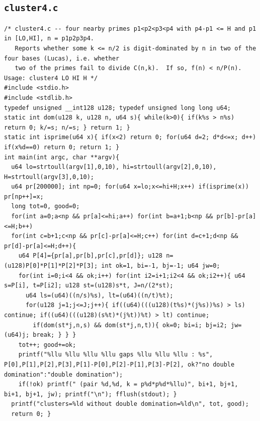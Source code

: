 \documentclass[11pt,a4paper]{article}
\theoremstyle{definition}
\begin{document}
\subsection{\texttt{cluster4.c}}
\begin{lstlisting}
/* cluster4.c -- four nearby primes p1<p2<p3<p4 with p4-p1 <= H and p1 in [LO,HI], n = p1p2p3p4.
   Reports whether some k <= n/2 is digit-dominated by n in two of the four bases (Lucas), i.e. whether
   two of the primes fail to divide C(n,k).  If so, f(n) < n/P(n).   Usage: cluster4 LO HI H */
#include <stdio.h>
#include <stdlib.h>
typedef unsigned __int128 u128; typedef unsigned long long u64;
static int dom(u128 k, u128 n, u64 s){ while(k>0){ if(k%s > n%s) return 0; k/=s; n/=s; } return 1; }
static int isprime(u64 x){ if(x<2) return 0; for(u64 d=2; d*d<=x; d++) if(x%d==0) return 0; return 1; }
int main(int argc, char **argv){
  u64 lo=strtoull(argv[1],0,10), hi=strtoull(argv[2],0,10), H=strtoull(argv[3],0,10);
  u64 pr[200000]; int np=0; for(u64 x=lo;x<=hi+H;x++) if(isprime(x)) pr[np++]=x;
  long tot=0, good=0;
  for(int a=0;a<np && pr[a]<=hi;a++) for(int b=a+1;b<np && pr[b]-pr[a]<=H;b++)
  for(int c=b+1;c<np && pr[c]-pr[a]<=H;c++) for(int d=c+1;d<np && pr[d]-pr[a]<=H;d++){
    u64 P[4]={pr[a],pr[b],pr[c],pr[d]}; u128 n=(u128)P[0]*P[1]*P[2]*P[3]; int ok=1, bi=-1, bj=-1; u64 jw=0;
    for(int i=0;i<4 && ok;i++) for(int i2=i+1;i2<4 && ok;i2++){ u64 s=P[i], t=P[i2]; u128 st=(u128)s*t, J=n/(2*st);
      u64 ls=(u64)((n/s)%s), lt=(u64)((n/t)%t);
      for(u128 j=1;j<=J;j++){ if((u64)(((u128)(t%s)*(j%s))%s) > ls) continue; if((u64)(((u128)(s%t)*(j%t))%t) > lt) continue;
        if(dom(st*j,n,s) && dom(st*j,n,t)){ ok=0; bi=i; bj=i2; jw=(u64)j; break; } } }
    tot++; good+=ok;
    printf("%llu %llu %llu %llu gaps %llu %llu %llu : %s", P[0],P[1],P[2],P[3],P[1]-P[0],P[2]-P[1],P[3]-P[2], ok?"no double domination":"double domination");
    if(!ok) printf(" (pair %d,%d, k = p%d*p%d*%llu)", bi+1, bj+1, bi+1, bj+1, jw); printf("\n"); fflush(stdout); }
  printf("clusters=%ld without double domination=%ld\n", tot, good);
  return 0; }
\end{lstlisting}
\end{document}
